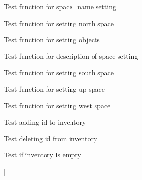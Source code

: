 \begin{DoxyRefList}
\item[\label{test__test000131}%
\hypertarget{test__test000131}{}%
Global \hyperlink{space__test_8c_a5a868ba017602ba6b58447cb394e81a6}{test2\+\_\+space\+\_\+set\+\_\+name} ()]Test function for space\+\_\+name setting  
\item[\label{test__test000149}%
\hypertarget{test__test000149}{}%
Global \hyperlink{space__test_8c_a3bc7fe26c1e36ffd195099a9983206e1}{test2\+\_\+space\+\_\+set\+\_\+north} ()]Test function for setting north space  
\item[\label{test__test000146}%
\hypertarget{test__test000146}{}%
Global \hyperlink{space__test_8c_a6349e2b547c71dee23b96d8bbf7a1806}{test2\+\_\+space\+\_\+set\+\_\+object} ()]Test function for setting objects  
\item[\label{test__test000136}%
\hypertarget{test__test000136}{}%
Global \hyperlink{space__test_8c_a1e5f764e51c98d987ceb47df09ed08d7}{test2\+\_\+space\+\_\+set\+\_\+short\+\_\+description} ()]Test function for description of space setting  
\item[\label{test__test000154}%
\hypertarget{test__test000154}{}%
Global \hyperlink{space__test_8c_ac9f950741f12ccfcc5ad5d9e71d3d90a}{test2\+\_\+space\+\_\+set\+\_\+south} ()]Test function for setting south space  
\item[\label{test__test000173}%
\hypertarget{test__test000173}{}%
Global \hyperlink{space__test_8c_a93508104720cd2f5ba4ac9652d8d238e}{test2\+\_\+space\+\_\+set\+\_\+up} ()]Test function for setting up space  
\item[\label{test__test000164}%
\hypertarget{test__test000164}{}%
Global \hyperlink{space__test_8c_aa51b05ffd99b7bbd8f2dfc23c8f85870}{test2\+\_\+space\+\_\+set\+\_\+west} ()]Test function for setting west space  
\item[\label{test__test000004}%
\hypertarget{test__test000004}{}%
Global \hyperlink{inventory__test_8c_adb75e7f71748feea51900c782343f550}{test3\+\_\+inventory\+\_\+add\+\_\+id} ()]Test adding id to inventory  
\item[\label{test__test000011}%
\hypertarget{test__test000011}{}%
Global \hyperlink{inventory__test_8c_a3dc930ea10c0e538e9f7227d5a7cdfa1}{test3\+\_\+inventory\+\_\+delete\+\_\+id} ()]Test deleting id from inventory  
\item[\label{test__test000019}%
\hypertarget{test__test000019}{}%
Global \hyperlink{inventory__test_8c_a9c8daeb141dbec6ddd5621edade53091}{test3\+\_\+inventory\+\_\+is\+\_\+empty} ()]Test if inventory is empty  
\item[\label{test__test000049}%

\end{DoxyRefList}

